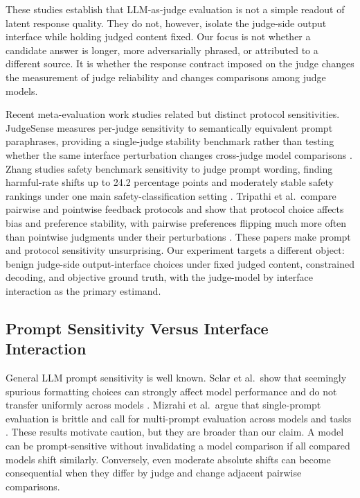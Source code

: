 \documentclass[journal]{IEEEtran}
\begin{document}
These studies establish that LLM-as-judge evaluation is not a simple readout of latent response quality. They do not, however, isolate the judge-side output interface while holding judged content fixed. Our focus is not whether a candidate answer is longer, more adversarially phrased, or attributed to a different source. It is whether the response contract imposed on the judge changes the measurement of judge reliability and changes comparisons among judge models.

Recent meta-evaluation work studies related but distinct protocol sensitivities. JudgeSense measures per-judge sensitivity to semantically equivalent prompt paraphrases, providing a single-judge stability benchmark rather than testing whether the same interface perturbation changes cross-judge model comparisons \citep{bellibatlu2026judgesense}. Zhang studies safety benchmark sensitivity to judge prompt wording, finding harmful-rate shifts up to 24.2 percentage points and moderately stable safety rankings under one main safety-classification setting \citep{zhang2026judgeconfig}. Tripathi et al.\ compare pairwise and pointwise feedback protocols and show that protocol choice affects bias and preference stability, with pairwise preferences flipping much more often than pointwise judgments under their perturbations \citep{tripathi2025pairwise}. These papers make prompt and protocol sensitivity unsurprising. Our experiment targets a different object: benign judge-side output-interface choices under fixed judged content, constrained decoding, and objective ground truth, with the judge-model by interface interaction as the primary estimand.

\subsection{Prompt Sensitivity Versus Interface Interaction}
\label{sec:rw-prompt-format}

General LLM prompt sensitivity is well known. Sclar et al.\ show that seemingly spurious formatting choices can strongly affect model performance and do not transfer uniformly across models \citep{sclar2024spurious}. Mizrahi et al.\ argue that single-prompt evaluation is brittle and call for multi-prompt evaluation across models and tasks \citep{mizrahi2024multiprompt}. These results motivate caution, but they are broader than our claim. A model can be prompt-sensitive without invalidating a model comparison if all compared models shift similarly. Conversely, even moderate absolute shifts can become consequential when they differ by judge and change adjacent pairwise comparisons.
\end{document}
